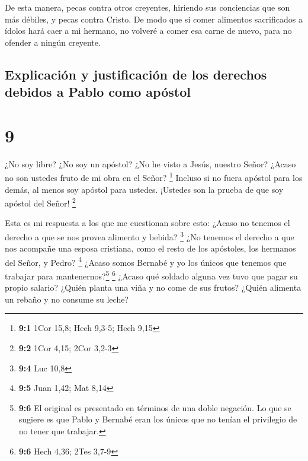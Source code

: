  De esta manera, pecas contra otros creyentes, hiriendo
sus conciencias que son más débiles, y pecas contra Cristo.
 De modo que si comer alimentos sacrificados a ídolos
hará caer a mi hermano, no volveré a comer esa carne de nuevo, para no
ofender a ningún creyente.

\hypertarget{explicaciuxf3n-y-justificaciuxf3n-de-los-derechos-debidos-a-pablo-como-apuxf3stol}{%
\subsection{Explicación y justificación de los derechos debidos a Pablo
como
apóstol}\label{explicaciuxf3n-y-justificaciuxf3n-de-los-derechos-debidos-a-pablo-como-apuxf3stol}}

\hypertarget{section-8}{%
\section{9}\label{section-8}}

 ¿No soy libre? ¿No soy un apóstol? ¿No he visto a Jesús,
nuestro Señor? ¿Acaso no son ustedes fruto de mi obra en el Señor?
\footnote{\textbf{9:1} 1Cor 15,8; Hech 9,3-5; Hech 9,15} 
Incluso si no fuera apóstol para los demás, al menos soy apóstol para
ustedes. ¡Ustedes son la prueba de que soy apóstol del Señor!
\footnote{\textbf{9:2} 1Cor 4,15; 2Cor 3,2-3}

 Esta es mi respuesta a los que me cuestionan sobre esto:
 ¿Acaso no tenemos el derecho a que se nos provea alimento
y bebida? \footnote{\textbf{9:4} Luc 10,8}  ¿No tenemos el
derecho a que nos acompañe una esposa cristiana, como el resto de los
apóstoles, los hermanos del Señor, y Pedro? \footnote{\textbf{9:5} Juan
  1,42; Mat 8,14}  ¿Acaso somos Bernabé y yo los únicos
que tenemos que trabajar para mantenernos?\footnote{\textbf{9:6} El
  original es presentado en términos de una doble negación. Lo que se
  sugiere es que Pablo y Bernabé eran los únicos que no tenían el
  privilegio de no tener que trabajar.} \footnote{\textbf{9:6} Hech
  4,36; 2Tes 3,7-9}  ¿Acaso qué soldado alguna vez tuvo
que pagar su propio salario? ¿Quién planta una viña y no come de sus
frutos? ¿Quién alimenta un rebaño y no consume su leche?

